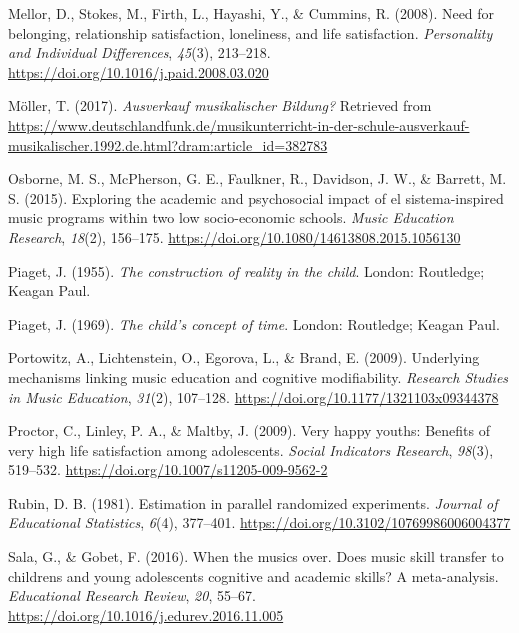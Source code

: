 \documentclass[a4, 12pt]{article}
\begin{document}
\leavevmode\hypertarget{ref-Mellor2008}{}%
Mellor, D., Stokes, M., Firth, L., Hayashi, Y., \& Cummins, R. (2008). Need for belonging, relationship satisfaction, loneliness, and life satisfaction. \emph{Personality and Individual Differences}, \emph{45}(3), 213--218. \url{https://doi.org/10.1016/j.paid.2008.03.020}

\leavevmode\hypertarget{ref-Moeller2017}{}%
Möller, T. (2017). \emph{Ausverkauf musikalischer Bildung?} Retrieved from \url{https://www.deutschlandfunk.de/musikunterricht-in-der-schule-ausverkauf-musikalischer.1992.de.html?dram:article_id=382783}

\leavevmode\hypertarget{ref-Osborne2015}{}%
Osborne, M. S., McPherson, G. E., Faulkner, R., Davidson, J. W., \& Barrett, M. S. (2015). Exploring the academic and psychosocial impact of el sistema-inspired music programs within two low socio-economic schools. \emph{Music Education Research}, \emph{18}(2), 156--175. \url{https://doi.org/10.1080/14613808.2015.1056130}

\leavevmode\hypertarget{ref-Piaget1955}{}%
Piaget, J. (1955). \emph{The construction of reality in the child}. London: Routledge; Keagan Paul.

\leavevmode\hypertarget{ref-Piaget1969}{}%
Piaget, J. (1969). \emph{The child's concept of time}. London: Routledge; Keagan Paul.

\leavevmode\hypertarget{ref-Portowitz2009}{}%
Portowitz, A., Lichtenstein, O., Egorova, L., \& Brand, E. (2009). Underlying mechanisms linking music education and cognitive modifiability. \emph{Research Studies in Music Education}, \emph{31}(2), 107--128. \url{https://doi.org/10.1177/1321103x09344378}

\leavevmode\hypertarget{ref-Proctor2009a}{}%
Proctor, C., Linley, P. A., \& Maltby, J. (2009). Very happy youths: Benefits of very high life satisfaction among adolescents. \emph{Social Indicators Research}, \emph{98}(3), 519--532. \url{https://doi.org/10.1007/s11205-009-9562-2}

\leavevmode\hypertarget{ref-Rubin1981}{}%
Rubin, D. B. (1981). Estimation in parallel randomized experiments. \emph{Journal of Educational Statistics}, \emph{6}(4), 377--401. \url{https://doi.org/10.3102/10769986006004377}

\leavevmode\hypertarget{ref-Sala2016}{}%
Sala, G., \& Gobet, F. (2016). When the musics over. Does music skill transfer to childrens and young adolescents cognitive and academic skills? A meta-analysis. \emph{Educational Research Review}, \emph{20}, 55--67. \url{https://doi.org/10.1016/j.edurev.2016.11.005}
\end{document}
